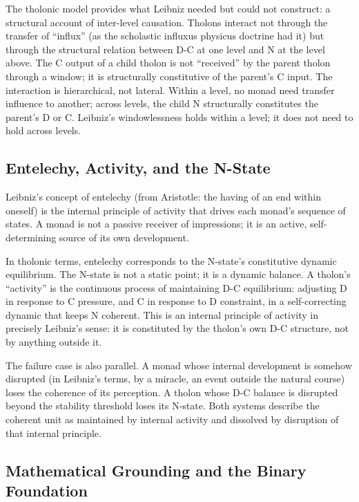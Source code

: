 \documentclass[12pt]{article}
\begin{document}
The tholonic model provides what Leibniz needed but could not construct:
a structural account of inter-level causation. Tholons interact not
through the transfer of ``influx'' (as the scholastic influxus physicus
doctrine had it) but through the structural relation between D-C at one
level and N at the level above. The C output of a child tholon is not
``received'' by the parent tholon through a window; it is structurally
constitutive of the parent's C input. The interaction is hierarchical,
not lateral. Within a level, no monad need transfer influence to
another; across levels, the child N structurally constitutes the
parent's D or C. Leibniz's windowlessness holds within a level; it does
not need to hold across levels.

\subsection{Entelechy, Activity, and the N-State}\label{entelechy-activity-and-the-n-state}

Leibniz's concept of entelechy (from Aristotle: the having of an end
within oneself) is the internal principle of activity that drives each
monad's sequence of states. A monad is not a passive receiver of
impressions; it is an active, self-determining source of its own
development.

In tholonic terms, entelechy corresponds to the N-state's constitutive
dynamic equilibrium. The N-state is not a static point; it is a dynamic
balance. A tholon's ``activity'' is the continuous process of
maintaining D-C equilibrium: adjusting D in response to C pressure, and
C in response to D constraint, in a self-correcting dynamic that keeps N
coherent. This is an internal principle of activity in precisely
Leibniz's sense: it is constituted by the tholon's own D-C structure,
not by anything outside it.

The failure case is also parallel. A monad whose internal development is
somehow disrupted (in Leibniz's terms, by a miracle, an event outside
the natural course) loses the coherence of its perception. A tholon
whose D-C balance is disrupted beyond the stability threshold loses its
N-state. Both systems describe the coherent unit as maintained by
internal activity and dissolved by disruption of that internal
principle.

\subsection{Mathematical Grounding and the Binary Foundation}\label{mathematical-grounding-and-the-binary-foundation}
\end{document}
